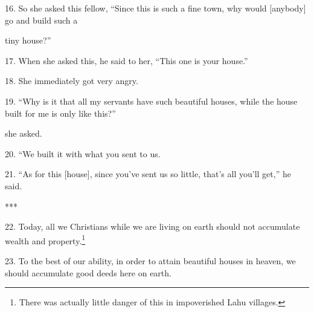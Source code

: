 16. So she asked this fellow, ``Since this is such a fine town, why would [anybody]
go and build such a

tiny house?''

17. When she asked this, he said to her, ``This one is your house.''

18. She immediately got very angry.

19. ``Why is it that all my servants have such beautiful houses, while the house
built for me is only like this?''

she asked.

20. ``We built it with what you sent to us.

21. ``As for this [house], since you've sent us so little, that's all you'll get,''
he said.

\begin{center}
***
\end{center}

22. Today, all we Christians while we are living on earth should not accumulate
wealth and property.\footnote{There was actually little danger of this in impoverished Lahu villages.}

23. To the best of our ability, in order to attain beautiful houses in heaven,
we should accumulate good deeds here on earth.

